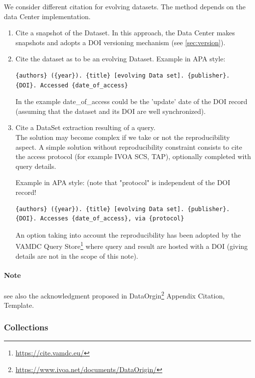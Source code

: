 \documentclass[11pt,a4paper]{ivoa}
\begin{document}
We consider different citation for evolving datasets. The method depends on the data Center implementation.

\begin{enumerate}
  \item Cite a snapshot of the Dataset. In this approach, the Data Center makes snapshots and adopts a DOI versioning mechanism (see \ref{sec:version}).
  \item  Cite the dataset as to be an evolving Dataset.
         Example in APA style:
\begin{verbatim}
{authors} ({year}). {title} [evolving Data set]. {publisher}.
{DOI}. Accessed {date_of_access}
\end{verbatim}

		In the example {date\_of\_access} could be the 'update' date of the DOI record (assuming that the dataset and its DOI are well synchronized).

	\item Cite a DataSet extraction resulting of a query.\\ 
	The solution may become complex if we take or not the reproducibility aspect.
	A simple solution without reproducibility constraint consists to cite the access protocol (for example IVOA SCS, TAP), optionally completed with query details.

	Example in APA style: (note that "protocol" is independent of the DOI record!
\begin{verbatim}
{authors} ({year}). {title} [evolving Data set]. {publisher}. 
{DOI}. Accesses {date_of_access}, via {protocol}	
\end{verbatim}

	An option taking into account the reproducibility has been adopted by the VAMDC Query Store\footnote{\url{https://cite.vamdc.eu/}} where query and result are hosted with a DOI (giving details are not in the scope of this note).
\end{enumerate}

\paragraph{Note} see also the acknowledgment proposed in DataOrgin\footnote{\url{https://www.ivoa.net/documents/DataOrigin/}} Appendix Citation, Template.

\subsubsection{Collections}
\end{document}
